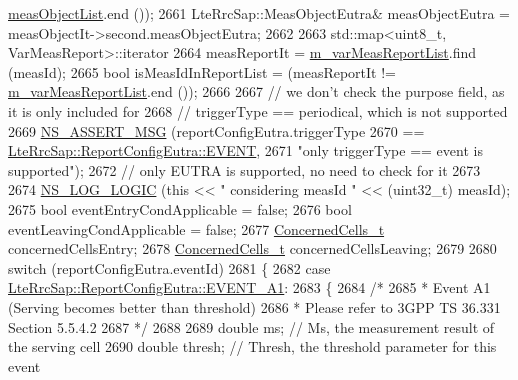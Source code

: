 \begin{DoxyCode}
      \hyperlink{structns3_1_1LteUeRrc_1_1VarMeasConfig_a79928885aabfe13a4d88e5d31233fac3}{measObjectList}.end ());
2661   LteRrcSap::MeasObjectEutra& measObjectEutra = measObjectIt->second.measObjectEutra;
2662 
2663   std::map<uint8\_t, VarMeasReport>::iterator
2664     measReportIt = \hyperlink{classns3_1_1LteUeRrc_a82da3c138c967761910c02b83724a0e4}{m\_varMeasReportList}.find (measId);
2665   \textcolor{keywordtype}{bool} isMeasIdInReportList = (measReportIt != \hyperlink{classns3_1_1LteUeRrc_a82da3c138c967761910c02b83724a0e4}{m\_varMeasReportList}.end ());
2666 
2667   \textcolor{comment}{// we don't check the purpose field, as it is only included for}
2668   \textcolor{comment}{// triggerType == periodical, which is not supported}
2669   \hyperlink{assert_8h_aff5ece9066c74e681e74999856f08539}{NS\_ASSERT\_MSG} (reportConfigEutra.triggerType
2670                  == \hyperlink{structns3_1_1LteRrcSap_1_1ReportConfigEutra_a457763ab0765f15b66c62f8177fa412ea492651ea4b8c0f484edb0c018e908fcf}{LteRrcSap::ReportConfigEutra::EVENT},
2671                  \textcolor{stringliteral}{"only triggerType == event is supported"});
2672   \textcolor{comment}{// only EUTRA is supported, no need to check for it}
2673 
2674   \hyperlink{group__logging_ga88acd260151caf2db9c0fc84997f45ce}{NS\_LOG\_LOGIC} (\textcolor{keyword}{this} << \textcolor{stringliteral}{" considering measId "} << (uint32\_t) measId);
2675   \textcolor{keywordtype}{bool} eventEntryCondApplicable = \textcolor{keyword}{false};
2676   \textcolor{keywordtype}{bool} eventLeavingCondApplicable = \textcolor{keyword}{false};
2677   \hyperlink{classns3_1_1LteUeRrc_abe2ee6e993c02a8e5e924bc777e3fa5c}{ConcernedCells\_t} concernedCellsEntry;
2678   \hyperlink{classns3_1_1LteUeRrc_abe2ee6e993c02a8e5e924bc777e3fa5c}{ConcernedCells\_t} concernedCellsLeaving;
2679 
2680   \textcolor{keywordflow}{switch} (reportConfigEutra.eventId)
2681     \{
2682     \textcolor{keywordflow}{case} \hyperlink{structns3_1_1LteRrcSap_1_1ReportConfigEutra_ab8152dc095987f60bee2e9115046902fa9c0b835cb85601f8a9e424fbf0afab4b}{LteRrcSap::ReportConfigEutra::EVENT\_A1}:
2683       \{
2684         \textcolor{comment}{/*}
2685 \textcolor{comment}{         * Event A1 (Serving becomes better than threshold)}
2686 \textcolor{comment}{         * Please refer to 3GPP TS 36.331 Section 5.5.4.2}
2687 \textcolor{comment}{         */}
2688 
2689         \textcolor{keywordtype}{double} ms; \textcolor{comment}{// Ms, the measurement result of the serving cell}
2690         \textcolor{keywordtype}{double} thresh; \textcolor{comment}{// Thresh, the threshold parameter for this event}

\end{DoxyCode}

